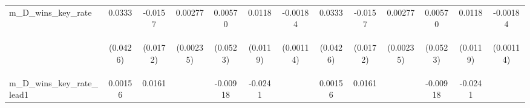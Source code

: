\documentclass[]{article}
\begin{document}
\begin{center}
\begin{tabular}{lcccccccccccc}
m\_D\_wins\_key\_rate & 0.0333 & -0.0157 & 0.00277 & 0.00570 & 0.0118 & -0.00184 & 0.0333 & -0.0157 & 0.00277 & 0.00570 & 0.0118 & -0.00184 \\
\vspace{4pt} & \begin{footnotesize}(0.0426)\end{footnotesize} & \begin{footnotesize}(0.0172)\end{footnotesize} & \begin{footnotesize}(0.00235)\end{footnotesize} & \begin{footnotesize}(0.0523)\end{footnotesize} & \begin{footnotesize}(0.0119)\end{footnotesize} & \begin{footnotesize}(0.00114)\end{footnotesize} & \begin{footnotesize}(0.0426)\end{footnotesize} & \begin{footnotesize}(0.0172)\end{footnotesize} & \begin{footnotesize}(0.00235)\end{footnotesize} & \begin{footnotesize}(0.0523)\end{footnotesize} & \begin{footnotesize}(0.0119)\end{footnotesize} & \begin{footnotesize}(0.00114)\end{footnotesize} \\
m\_D\_wins\_key\_rate\_lead1 & 0.00156 & 0.0161 &  & -0.00918 & -0.0241 &  & 0.00156 & 0.0161 &  & -0.00918 & -0.0241 &  \\

\end{tabular}
\end{center}
\end{document}
